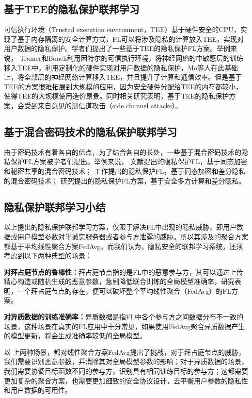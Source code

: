 \subsection{基于TEE的隐私保护联邦学习}
可信执行环境（Trusted execution environment，TEE）基于硬件安全的CPU，实现了基于内存隔离的安全计算方式，FL可以将涉及隐私的计算放入TEE，实现对用户数据的隐私保护。学者们提出了一些基于TEE的隐私保护FL方案\cite{tramer2018slalom, mo2019efficient, mo2021ppfl, mo2020darknetz}。举例来说，
Tramer和Boneh\cite{tramer2018slalom}利用因特尔的可信执行环境，将神经网络的中敏感层的训练移入TEE中，利用定制化的硬件实现对用户数据的隐私保护，Mo等人\cite{mo2021ppfl}在此基础上，将全部层的神经网络计算移入TEE，并且提升了计算和通信效率。但是基于TEE的方案很难拓展到大规模的应用，因为安全硬件分配给TEE的内存都较小，使得TEE的大规模使用造价昂贵。同时相关研究\cite{van2018foreshadow}表明，基于TEE的隐私保护方案，会受到来自意见的测信道攻击（side channel attacks）。

\subsection{基于混合密码技术的隐私保护联邦学习}
由于密码技术有着各自的优点，为了结合各自的长处，一些基于混合密码技术的隐私保护FL方案\cite{choquette2021capc, hao2019efficient, hao2019towards, mugunthan2019smpai, truex2019hybrid, xu2019verifynet, xu2019hybridalpha, zhang2020privacy, zhao2020smss}被学者们提出。举例来说，
文献\cite{xu2019verifynet, zhao2020smss}提出的隐私保护FL，基于同态加密和秘密共享的混合密码技术；
工作\cite{hao2019efficient, hao2019towards}提出的隐私保护FL，基于同态加密和差分隐私的混合密码技术；
研究\cite{mugunthan2019smpai, truex2019hybrid, xu2019hybridalpha}提出的隐私保护FL方案，基于安全多方计算和差分隐私。

\subsection{隐私保护联邦学习小结}
以上提出的隐私保护联邦学习方案，仅限于解决FL中出现的隐私威胁，即用户数据或用户模型参数对半诚实服务器或者参与方泄露的威胁。所以其涉及的聚合方案都基于平均线性聚合方案FedAvg\cite{mcmahan2017communication}，而我们认为，隐私安全的联邦学习系统，还须考虑到以下两种典型的场景：
\begin{compactitem}
	\item \textbf{对拜占庭节点的鲁棒性：}拜占庭节点指的是FL中的恶意参与方，其可以通过上传精心构造或随机生成的恶意参数，急剧降低联合训练的全局模型准确率，研究\cite{blanchard2017machine}表明，一个拜占庭节点的存在，便可以破坏整个平均线性聚合（FedAvg）的FL方案。
	\item \textbf{对异质数据的训练准确率：}异质数据是指FL中各个参与方之间数据分布不一致的场景，这种场景在真实的FL应用中十分常见\cite{li2020federated, gao2022feddc, ghosh2020efficient, briggs2020federated}，如果使用FedAvg聚合异质数据产生的模型更新，将会生成准确率较低的全局模型。
\end{compactitem}
以 上两种场景，都对线性聚合方案FedAvg提出了挑战，对于拜占庭节点的威胁，我们需要识别恶意参数，并消除其对全局模型参数的影响；对于异质数据的场景，我们需要协调目标函数不同的参与方，识别具有相同训练目标的参与方；这都需要更加复杂的聚合方案，也需要更加细致的安全协议设计，去平衡用户参数的隐私性和用户数据的可用性。

